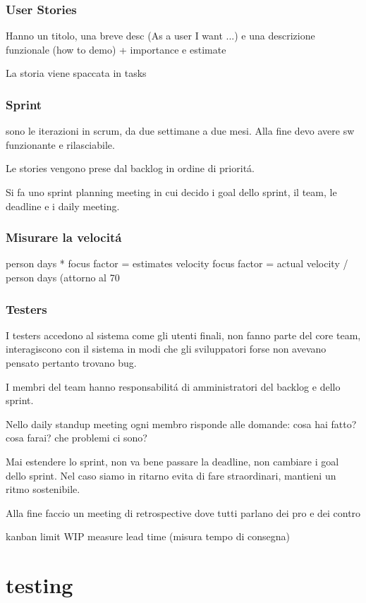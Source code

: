 \subsection{User Stories}
Hanno un titolo, una breve desc (As a user I want ...) e una descrizione 
funzionale (how to demo) + importance e estimate

La storia viene spaccata in tasks 

\subsection{Sprint}
sono le iterazioni in scrum, da due settimane a due mesi. Alla fine 
devo avere sw funzionante e rilasciabile.

Le stories vengono prese dal backlog in ordine di priorit\'a.

Si fa uno sprint planning meeting in cui decido i goal dello sprint, il team,
le deadline e i daily meeting.

\subsection{Misurare la velocit\'a}
person days * focus factor = estimates velocity
focus factor = actual velocity / person days
(attorno al 70%

\subsection{Testers}
I testers accedono al sistema come gli utenti finali, non fanno parte del 
core team, interagiscono con il sistema in modi che gli sviluppatori forse 
non avevano pensato pertanto trovano bug.

I membri del team hanno responsabilit\'a di amministratori del backlog e dello 
sprint. 

Nello daily standup meeting ogni membro risponde alle domande:
    cosa hai fatto? cosa farai? che problemi ci sono?

Mai estendere lo sprint, non va bene passare la deadline, non cambiare i goal
dello sprint. Nel caso siamo in ritarno evita di fare straordinari, mantieni un 
ritmo sostenibile. 

Alla fine faccio un meeting di retrospective dove tutti parlano dei pro e dei 
contro

kanban
limit WIP
measure lead time (misura tempo di consegna)

\chapter{testing}
